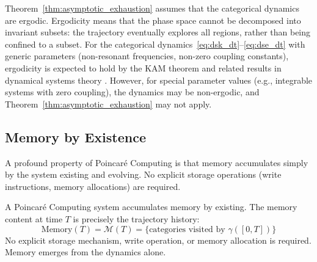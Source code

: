 \begin{remark}
\label{rem:ergodicity}
Theorem~\ref{thm:asymptotic_exhaustion} assumes that the categorical dynamics are ergodic. Ergodicity means that the phase space cannot be decomposed into invariant subsets: the trajectory eventually explores all regions, rather than being confined to a subset. For the categorical dynamics~\eqref{eq:dsk_dt}--\eqref{eq:dse_dt} with generic parameters (non-resonant frequencies, non-zero coupling constants), ergodicity is expected to hold by the KAM theorem and related results in dynamical systems theory \citep{arnold1989mathematical}. However, for special parameter values (e.g., integrable systems with zero coupling), the dynamics may be non-ergodic, and Theorem~\ref{thm:asymptotic_exhaustion} may not apply.
\end{remark}

\subsection{Memory by Existence}

A profound property of Poincaré Computing is that memory accumulates simply by the system existing and evolving. No explicit storage operations (write instructions, memory allocations) are required.

\begin{theorem}
\label{thm:existence_memory}
A Poincaré Computing system accumulates memory by existing. The memory content at time $T$ is precisely the trajectory history:
\begin{equation}
\text{Memory}(T) = \mathcal{M}(T) = \{\text{categories visited by } \gamma([0, T])\}
\label{eq:existence_memory}
\end{equation}
No explicit storage mechanism, write operation, or memory allocation is required. Memory emerges from the dynamics alone.
\end{theorem}

